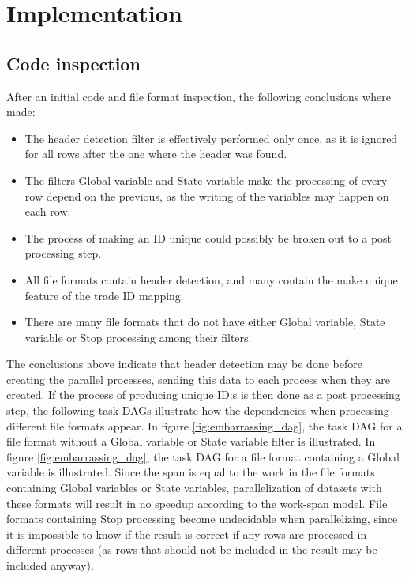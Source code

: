 \section{Implementation}

\subsection{Code inspection}
After an initial code and file format inspection, the following conclusions where made:
\begin{itemize}
  \item The header detection filter is effectively performed only once, as it is ignored for all rows after the one where the header was found.
  \item The filters Global variable and State variable make the processing of every row depend on the previous, as the writing of the variables may happen on each row.
  \item The process of making an ID unique could possibly be broken out to a post processing step.
  \item All file formats contain header detection, and many contain the make unique feature of the trade ID mapping.
  \item There are many file formats that do not have either Global variable, State variable or Stop processing among their filters.
\end{itemize}

The conclusions above indicate that header detection may be done before creating the parallel processes, sending this data to each process when they are created.
If the process of producing unique ID:s is then done as a post processing step, the following task DAGs illustrate how the dependencies when processing different
file formats appear. In figure \ref{fig:embarrassing_dag}, the task DAG for a file format without a Global variable or State variable filter is illustrated.
In figure \ref{fig:embarrassing_dag}, the task DAG for a file format containing a Global variable is illustrated. Since the span is equal to the work
in the file formats containing Global variables or State variables, parallelization of datasets with these formats will result in no speedup according to the
work-span model. File formats containing Stop processing become undecidable when parallelizing, since it is impossible to know if the result is correct if
any rows are processed in different processes (as rows that should not be included in the result may be included anyway).

